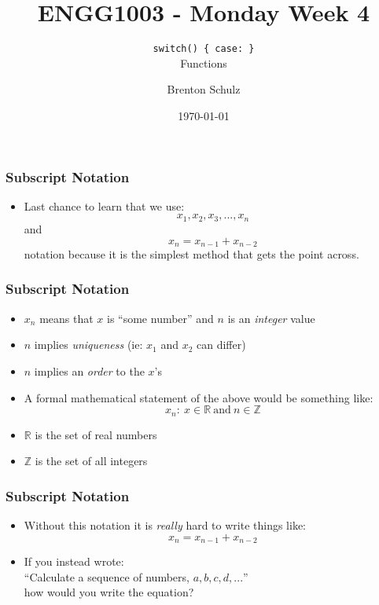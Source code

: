 \documentclass[14pt]{beamer}
\title{ENGG1003 - Monday Week 4}
\subtitle{\texttt{switch() \{ case: \}} \\ Functions}
\author{Brenton Schulz}
\institute{University of Newcastle}
\date{\today}
\begin{document}
\titlepage

\begin{frame}
\frametitle{Subscript Notation}
\begin{itemize}
\item Last chance to learn that we use:
\begin{equation}
x_1, x_2, x_3, ... , x_n
\end{equation}
and
\begin{equation}
x_n = x_{n-1} + x_{n-2}
\end{equation}
notation because it is the simplest method that gets the point across.
\end{itemize}
\end{frame}

\begin{frame}[fragile]
\frametitle{Subscript Notation}
\begin{itemize}
\item $x_n$ means that $x$ is ``some number'' and $n$ is an \textit{integer} value
\item $n$ implies \textit{uniqueness} (ie: $x_1$ and $x_2$ can differ)
\item $n$ implies an \textit{order} to the $x$'s
\item A formal mathematical statement of the above would be something like:
\begin{equation}
x_n :~x \in \mathbb{R}~\textrm{and} ~ n \in \mathbb{Z}
\end{equation}
\item $\mathbb{R}$ is the set of real numbers
\item $\mathbb{Z}$ is the set of all integers
\end{itemize}
\end{frame}

\begin{frame}[fragile]
\frametitle{Subscript Notation}
\begin{itemize}
\item Without this notation it is \textit{really} hard to write things like:
\begin{equation}
x_n = x_{n-1} + x_{n-2}
\end{equation}
\pause
\item If you instead wrote:\\
``Calculate a sequence of numbers, $a,b,c,d,...$''\\
how would you write the equation?
\end{itemize}
\end{frame}
\end{document}
